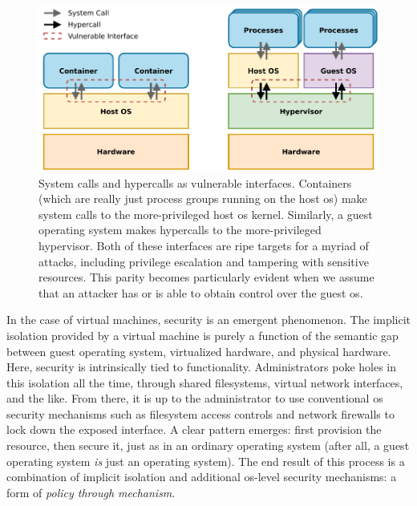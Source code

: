 \begin{figure}[htbp]
  \centering
  \includegraphics[width=0.8\linewidth]{figs/confinement-problem/syscall-hypercall.pdf}
  \caption[System calls and hypercalls as vulnerable interfaces]{
    System calls and hypercalls as vulnerable interfaces. Containers (which are really
    just process groups running on the host \gls{os}) make system calls to the
    more-privileged host \gls{os} kernel. Similarly, a guest operating system makes
    hypercalls to the more-privileged hypervisor. Both of these interfaces are ripe
    targets for a myriad of attacks, including privilege escalation and tampering with
    sensitive resources. This parity becomes particularly evident when we assume that an
    attacker has or is able to obtain control over the guest \gls{os}.
  }%
  \label{fig:syscall-hypercall}
\end{figure}


In the case of virtual machines, security is an emergent phenomenon. The implicit
isolation provided by a virtual machine is purely a function of the semantic gap between
guest operating system, virtualized hardware, and physical hardware. Here, security is
intrinsically tied to functionality. Administrators poke holes in this isolation all the
time, through shared filesystems, virtual network interfaces, and the like. From there, it
is up to the administrator to use conventional \gls{os} security mechanisms such as
filesystem access controls and network firewalls to lock down the exposed interface.
A clear pattern emerges: first provision the resource, then secure it, just as in an
ordinary operating system (after all, a guest operating system \textit{is} just an
operating system). The end result of this process is a combination of implicit isolation
and additional \gls{os}-level security mechanisms: a form of \textit{policy through
mechanism}.

